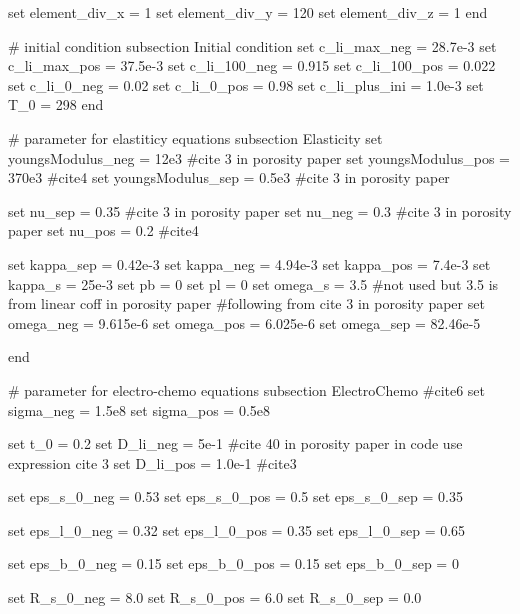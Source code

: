\begin{DoxyCode}
\textcolor{keyword}{set} element\_div\_x = 1
\textcolor{keyword}{set} element\_div\_y = 120
\textcolor{keyword}{set} element\_div\_z = 1
end

\textcolor{preprocessor}{# initial condition}
subsection Initial condition
\textcolor{keyword}{set} c\_li\_max\_neg = 28.7e-3
\textcolor{keyword}{set} c\_li\_max\_pos = 37.5e-3
\textcolor{keyword}{set} c\_li\_100\_neg = 0.915
set c\_li\_100\_pos = 0.022
set c\_li\_0\_neg = 0.02
set c\_li\_0\_pos = 0.98
set c\_li\_plus\_ini = 1.0e-3
\textcolor{keyword}{set} T\_0 = 298
end

\textcolor{preprocessor}{# parameter for elastiticy equations}
subsection Elasticity
\textcolor{keyword}{set} youngsModulus\_neg = 12e3 #cite 3 in porosity paper
\textcolor{keyword}{set} youngsModulus\_pos = 370e3 #cite4
\textcolor{keyword}{set} youngsModulus\_sep = 0.5e3 #cite 3 in porosity paper

\textcolor{keyword}{set} nu\_sep = 0.35 #cite 3 in porosity paper
\textcolor{keyword}{set} nu\_neg = 0.3 #cite 3 in porosity paper
\textcolor{keyword}{set} nu\_pos = 0.2 #cite4 

\textcolor{keyword}{set} kappa\_sep = 0.42e-3
\textcolor{keyword}{set} kappa\_neg = 4.94e-3
\textcolor{keyword}{set} kappa\_pos = 7.4e-3
\textcolor{keyword}{set} kappa\_s = 25e-3
\textcolor{keyword}{set} pb = 0
\textcolor{keyword}{set} pl = 0
\textcolor{keyword}{set} omega\_s = 3.5 #not used but 3.5 is from linear coff in porosity paper
\textcolor{preprocessor}{#following from cite 3 in porosity paper}
\textcolor{keyword}{set} omega\_neg = 9.615e-6 
\textcolor{keyword}{set} omega\_pos = 6.025e-6
\textcolor{keyword}{set} omega\_sep = 82.46e-5

end

\textcolor{preprocessor}{# parameter for electro-chemo equations}
subsection ElectroChemo #cite6
\textcolor{keyword}{set} sigma\_neg = 1.5e8
\textcolor{keyword}{set} sigma\_pos = 0.5e8

\textcolor{keyword}{set} t\_0 = 0.2
set D\_li\_neg = 5e-1 #cite 40 in porosity paper in code use expression cite 3 
\textcolor{keyword}{set} D\_li\_pos = 1.0e-1 #cite3

\textcolor{keyword}{set} eps\_s\_0\_neg = 0.53
set eps\_s\_0\_pos = 0.5
set eps\_s\_0\_sep = 0.35

set eps\_l\_0\_neg = 0.32
set eps\_l\_0\_pos = 0.35
set eps\_l\_0\_sep = 0.65

set eps\_b\_0\_neg = 0.15
set eps\_b\_0\_pos = 0.15
set eps\_b\_0\_sep = 0

\textcolor{keyword}{set} R\_s\_0\_neg = 8.0
set R\_s\_0\_pos = 6.0
set R\_s\_0\_sep = 0.0


\end{DoxyCode}
